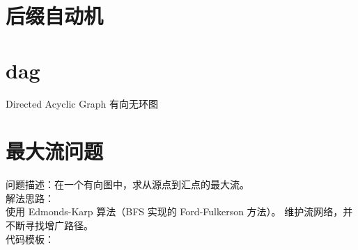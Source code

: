 \documentclass[12pt,twiside,a4paper]{ctexbook}
\numberwithin{chapter}{part}
\begin{document}
\section{后缀自动机}

\section{dag}
Directed Acyclic Graph 有向无环图

\section{最大流问题}
问题描述：在一个有向图中，求从源点到汇点的最大流。\\
解法思路：\\
使用 Edmonds-Karp 算法（BFS 实现的 Ford-Fulkerson 方法）。
维护流网络，并不断寻找增广路径。\\
代码模板：
\end{document}
